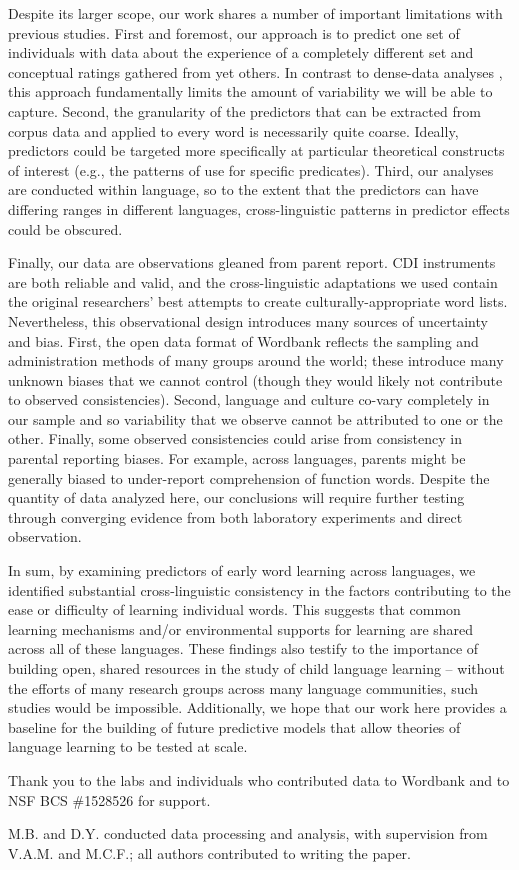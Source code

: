 \documentclass[manuscript]{stjour}
\begin{document}
Despite its larger scope, our work shares a number of important
limitations with previous studies. First and foremost, our approach is
to predict one set of individuals with data about the experience of a
completely different set and conceptual ratings gathered from yet
others. In contrast to dense-data analyses \citep{roy2015}, this
approach fundamentally limits the amount of variability we will be able
to capture. Second, the granularity of the predictors that can be
extracted from corpus data and applied to every word is necessarily
quite coarse. Ideally, predictors could be targeted more specifically at
particular theoretical constructs of interest (e.g., the patterns of use
for specific predicates). Third, our analyses are conducted within
language, so to the extent that the predictors can have differing ranges
in different languages, cross-linguistic patterns in predictor effects
could be obscured.

Finally, our data are observations gleaned from parent report. CDI
instruments are both reliable and valid, and the cross-linguistic
adaptations we used contain the original researchers' best attempts to
create culturally-appropriate word lists. Nevertheless, this
observational design introduces many sources of uncertainty and bias.
First, the open data format of Wordbank reflects the sampling and
administration methods of many groups around the world; these introduce
many unknown biases that we cannot control (though they would likely not
contribute to observed consistencies). Second, language and culture
co-vary completely in our sample and so variability that we observe
cannot be attributed to one or the other. Finally, some observed
consistencies could arise from consistency in parental reporting biases.
For example, across languages, parents might be generally biased to
under-report comprehension of function words. Despite the quantity of
data analyzed here, our conclusions will require further testing through
converging evidence from both laboratory experiments and direct
observation.

In sum, by examining predictors of early word learning across languages,
we identified substantial cross-linguistic consistency in the factors
contributing to the ease or difficulty of learning individual words.
This suggests that common learning mechanisms and/or environmental
supports for learning are shared across all of these languages. These
findings also testify to the importance of building open, shared
resources in the study of child language learning -- without the efforts
of many research groups across many language communities, such studies
would be impossible. Additionally, we hope that our work here provides a
baseline for the building of future predictive models that allow
theories of language learning to be tested at scale.



\acknowledgments
Thank you to the labs and individuals who contributed data to Wordbank
and to NSF BCS \#1528526 for support.

\authorcontributions
M.B. and D.Y. conducted data processing and analysis, with supervision
from V.A.M. and M.C.F.; all authors contributed to writing the paper.


\end{document}
